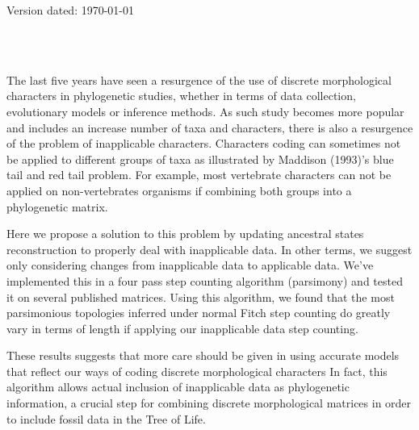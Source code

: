\documentclass[a4paper,11pt]{article}
\begin{document}
\begin{flushright}
Version dated: \today
\end{flushright}
\begin{center}

\\
\bigskip
\\

\end{center}
The last five years have seen a resurgence of the use of discrete morphological characters in phylogenetic studies, whether in terms of data collection, evolutionary models or inference methods.
As such study becomes more popular and includes an increase number of taxa and characters, there is also a resurgence of the problem of inapplicable characters.
Characters coding can sometimes not be applied to different groups of taxa as illustrated by Maddison (1993)'s blue tail and red tail problem.
For example, most vertebrate characters can not be applied on non-vertebrates organisms if combining both groups into a phylogenetic matrix.

Here we propose a solution to this problem by updating ancestral states reconstruction to properly deal with inapplicable data.
In other terms, we suggest only considering changes from inapplicable data to applicable data.
We've implemented this in a four pass step counting algorithm (parsimony) and tested it on several published matrices.
Using this algorithm, we found that the most parsimonious topologies inferred under normal Fitch step counting do greatly vary in terms of length if applying our inapplicable data step counting.

These results suggests that more care should be given in using accurate models that reflect our ways of coding discrete morphological characters
In fact, this algorithm allows actual inclusion of inapplicable data as phylogenetic information, a crucial step for combining discrete morphological matrices in order to include fossil data in the Tree of Life.
\end{document}
